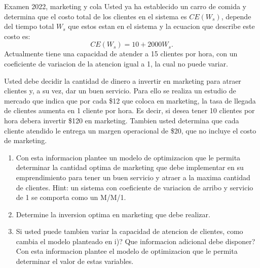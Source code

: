 \begin{enunciado}{Examen 2022, marketing y cola}
Usted ya ha establecido un carro de comida y determina que el costo total de los clientes en el sistema es $CE(W_s)$, depende del tiempo total $W_s$ que estos estan en el sistema y la ecuacion que describe este costo es:
\[
  CE(W_s)=10+2000W_s.
\]
Actualmente tiene una capacidad de atender a 15 clientes por hora, con un coeficiente de variacion de la atencion igual a 1, la cual no puede variar.

Usted debe decidir la cantidad de dinero a invertir en marketing para atraer clientes y, a su vez, dar un buen servicio. Para ello se realiza un estudio de mercado que indica que por cada \$12 que coloca en marketing, la tasa de llegada de clientes aumenta en 1 cliente por hora. Es decir, si desea tener 10 clientes por hora debera invertir \$120 en marketing. Tambien usted determina que cada cliente atendido le entrega un margen operacional de \$20, que no incluye el costo de marketing.

\begin{enumerate}[label=\roman*.]
  \item Con esta informacion plantee un modelo de optimizacion que le permita determinar la cantidad optima de marketing que debe implementar en su emprendimiento para tener un buen servicio y atraer a la maxima cantidad de clientes. Hint: un sistema con coeficiente de variacion de arribo y servicio de 1 se comporta como un M/M/1.
  \item Determine la inversion optima en marketing que debe realizar.
  \item Si usted puede tambien variar la capacidad de atencion de clientes, como cambia el modelo planteado en i)? Que informacion adicional debe disponer? Con esta informacion plantee el modelo de optimizacion que le permita determinar el valor de estas variables.
\end{enumerate}
\end{enunciado}

